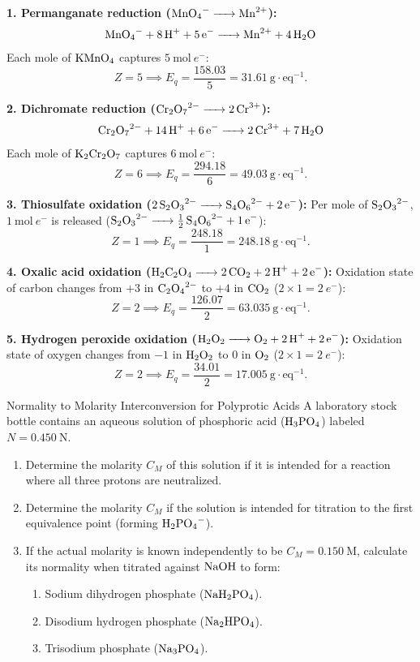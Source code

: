 \begin{solution}
\textbf{1. Permanganate reduction ($\ce{MnO4^- -> Mn^{2+}}$):}
\[
\ce{MnO4- + 8 H+ + 5 e- -> Mn^{2+} + 4 H2O}
\]
Each mole of $\ce{KMnO4}$ captures $5\ \mathrm{mol}\ e^-$:
\[
Z = 5 \implies E_q = \frac{158.03}{5} = \mathbf{31.61\ \mathrm{g\cdot eq^{-1}}}.
\]

\textbf{2. Dichromate reduction ($\ce{Cr2O7^{2-} -> 2 Cr^{3+}}$):}
\[
\ce{Cr2O7^{2-} + 14 H+ + 6 e- -> 2 Cr^{3+} + 7 H2O}
\]
Each mole of $\ce{K2Cr2O7}$ captures $6\ \mathrm{mol}\ e^-$:
\[
Z = 6 \implies E_q = \frac{294.18}{6} = \mathbf{49.03\ \mathrm{g\cdot eq^{-1}}}.
\]

\textbf{3. Thiosulfate oxidation ($\ce{2 S2O3^{2-} -> S4O6^{2-} + 2 e-}$):}
Per mole of $\ce{S2O3^{2-}}$, $1\ \mathrm{mol}\ e^-$ is released ($\ce{S2O3^{2-} -> \frac{1}{2} S4O6^{2-} + 1 e-}$):
\[
Z = 1 \implies E_q = \frac{248.18}{1} = \mathbf{248.18\ \mathrm{g\cdot eq^{-1}}}.
\]

\textbf{4. Oxalic acid oxidation ($\ce{H2C2O4 -> 2 CO2 + 2 H+ + 2 e-}$):}
Oxidation state of carbon changes from $+3$ in $\ce{C2O4^{2-}}$ to $+4$ in $\ce{CO2}$ ($2 \times 1 = 2\ e^-$):
\[
Z = 2 \implies E_q = \frac{126.07}{2} = \mathbf{63.035\ \mathrm{g\cdot eq^{-1}}}.
\]

\textbf{5. Hydrogen peroxide oxidation ($\ce{H2O2 -> O2 + 2 H+ + 2 e-}$):}
Oxidation state of oxygen changes from $-1$ in $\ce{H2O2}$ to $0$ in $\ce{O2}$ ($2 \times 1 = 2\ e^-$):
\[
Z = 2 \implies E_q = \frac{34.01}{2} = \mathbf{17.005\ \mathrm{g\cdot eq^{-1}}}.
\]
\end{solution}

\begin{exercise}{Normality to Molarity Interconversion for Polyprotic Acids}
A laboratory stock bottle contains an aqueous solution of phosphoric acid ($\ce{H3PO4}$) labeled $N = 0.450\ \mathrm{N}$.
\begin{enumerate}[leftmargin=1.5em,itemsep=2pt]
  \item Determine the molarity $C_M$ of this solution if it is intended for a reaction where all three protons are neutralized.
  \item Determine the molarity $C_M$ if the solution is intended for titration to the first equivalence point (forming $\ce{H2PO4^-}$).
  \item If the actual molarity is known independently to be $C_M = 0.150\ \mathrm{M}$, calculate its normality when titrated against $\ce{NaOH}$ to form:
  \begin{enumerate}[leftmargin=1.2em,itemsep=1pt]
    \item Sodium dihydrogen phosphate ($\ce{NaH2PO4}$).
    \item Disodium hydrogen phosphate ($\ce{Na2HPO4}$).
    \item Trisodium phosphate ($\ce{Na3PO4}$).
  \end{enumerate}
\end{enumerate}
\end{exercise}

